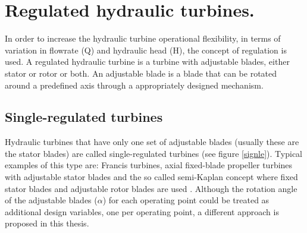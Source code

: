 

\ifpdf
    \graphicspath{{8/figures/PNG/}{8/figures/PDF/}{8/figures/}}
\else
    \graphicspath{{8/figures/EPS/}{8/figures/}}
\fi


\chapter{Regulated hydraulic turbines.}

In order to increase the hydraulic turbine operational flexibility, in terms of variation in flowrate (Q) and hydraulic head (H), the concept of regulation is used. A regulated hydraulic turbine is a turbine with adjustable blades, either stator or rotor or both. An adjustable blade is a blade that can be rotated around a predefined axis through a appropriately designed mechanism. 


\section{Single-regulated turbines}
\label{single.regulated}

Hydraulic turbines that have only one set of adjustable blades (usually these are the stator blades) are called single-regulated turbines (see figure \ref{signle}). Typical examples of this type are: Francis turbines, axial fixed-blade propeller turbines with adjustable stator blades and the so called semi-Kaplan concept where fixed stator blades and adjustable rotor blades are used \cite{Papanto,drtina1999hydraulic}.  
Although the rotation angle of the adjustable blades ($\alpha$) for each operating point could be treated as additional design variables, one per operating point, a different approach is proposed in this thesis. 
                 

